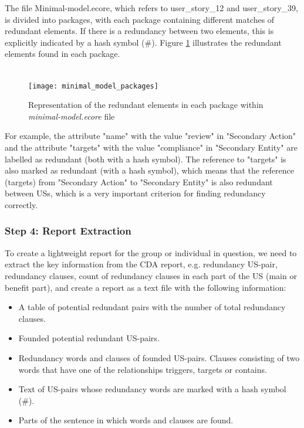 \begin{example}
	The file Minimal-model.ecore, which refers to user\_story\_12 and user\_story\_39, is divided into packages, with each package containing different matches of redundant elements. If there is a redundancy between two elements, this is explicitly indicated by a hash symbol (\#). Figure \ref{fig:step3_cda_package} illustrates the redundant elements found in each package.\\\\
	\begin{figure}[h]
		\centering
		\texttt{[image: minimal\_model\_packages]}
		\caption{Representation of the redundant elements in each package within \textit{minimal-model.ecore} file}\label{fig:step3_cda_package}
	\end{figure}
	For example, the attribute "name" with the value "review" in "Secondary Action" and the attribute "targets" with the value "compliance" in "Secondary Entity" are labelled as redundant (both with a hash symbol). The reference to "targets" is also marked as redundant (with a hash symbol), which means that the reference (targets) from "Secondary Action" to "Secondary Entity" is also redundant between USs, which is a very important criterion for finding redundancy correctly.
\end{example}
\subsubsection*{Step 4: Report Extraction}\label{step_4}
To create a lightweight report for the group or individual in question, we need to extract the key information from the CDA report, e.g. redundancy US-pair, redundancy clauses, count of redundancy clauses in each part of the US (main or benefit part), and create a report as a text file with the following information:
\begin{itemize}
	
	\item A table of potential redundant pairs with the number of total redundancy clauses.
	
	\item Founded potential redundant US-pairs.
	
	\item Redundancy words and clauses of founded US-pairs. Clauses consisting of two words that have one of the relationships triggers, targets or contains.
	
	\item Text of US-pairs whose redundancy words are marked with a hash symbol (\#).
	
	\item Parts of the sentence in which words and clauses are found.
\end{itemize}

